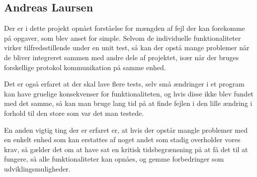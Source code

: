 
\subsection{Andreas Laursen}
Der er i dette projekt opnået forståelse for mængden af fejl der kan forekomme på opgaver, som blev anset for simple. Selvom de individuelle funktionaliteter virker tilfredsstillende under en unit test, så kan der opstå mange problemer når de bliver integreret sammen med andre dele af projektet, især når der bruges forskellige protokol kommunikation på samme enhed.

Det er også erfaret at der skal lave flere tests, selv små ændringer i et program kan have gruelige konsekvenser for funktionaliteten, og hvis disse ikke blev fundet med det samme, så kan man bruge lang tid på at finde fejlen i den lille ændring i forhold til den store som var det man testede.

En anden vigtig ting der er erfaret er, at hvis der opstår mangle problemer med en enkelt enhed som kan erstattes af noget andet som stadig overholder vores krav, så gælder det om at have sat en kritisk tidsbegrænsning på at få det til at fungere, så alle funktionaliteter kan opnåes, og gemme forbedringer som udviklingsmuligheder.